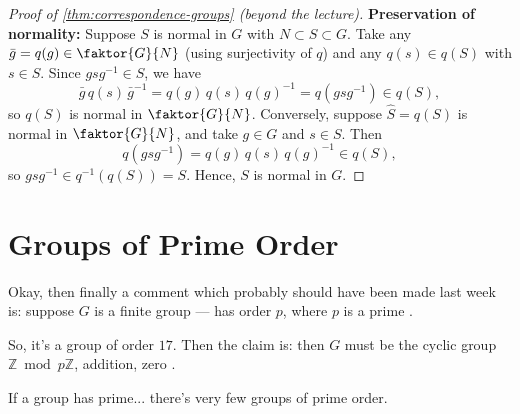 \begin{content}
\begin{proof}[Proof of \cref{thm:correspondence-groups} (beyond the lecture)]
\textbf{Preservation of normality:}
Suppose $S$ is normal in $G$ with $N \subset S \subset G$. Take any $\bar{g} = q(g) \in \faktor{G}{N}$ (using surjectivity of $q$) and any $q(s) \in q(S)$ with $s \in S$. Since $g s g^{-1} \in S$, we have
\[
\bar{g}\, q(s)\, \bar{g}^{-1} = q(g)\, q(s)\, q(g)^{-1} = q(g s g^{-1}) \in q(S),
\]
so $q(S)$ is normal in $\faktor{G}{N}$. Conversely, suppose $\hat{S} = q(S)$ is normal in $\faktor{G}{N}$, and take $g \in G$ and $s \in S$. Then
\[
q(g s g^{-1}) = q(g)\, q(s)\, q(g)^{-1} \in q(S),
\]
so $g s g^{-1} \in q^{-1}(q(S)) = S$. Hence, $S$ is normal in $G$.
\end{proof}
\end{content}

\begin{hidden}
\end{hidden}

\section{Groups of Prime Order}

\begin{speech}[00:18:54 - 00:19:36]
Okay, then finally a comment which probably should have been made last week is: suppose $G$ is a finite group --- has order $p$, where $p$ is a prime .

So, it's a group of order $17$. Then the claim is: then $G$ must be the cyclic group $\mathbb{Z} \bmod p\mathbb{Z}$, addition, zero .

If a group has prime... there's very few groups of prime order.
\end{speech}

\begin{content}

\end{content}

